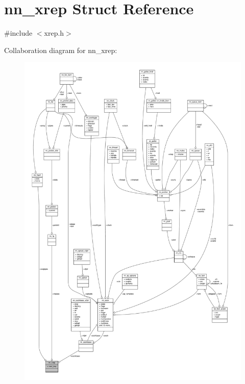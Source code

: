 \hypertarget{structnn__xrep}{}\section{nn\+\_\+xrep Struct Reference}
\label{structnn__xrep}


{\ttfamily \#include $<$xrep.\+h$>$}



Collaboration diagram for nn\+\_\+xrep\+:\nopagebreak
\begin{figure}[H]
\begin{center}
\leavevmode
\includegraphics[width=350pt]{structnn__xrep__coll__graph}
\end{center}
\end{figure}
